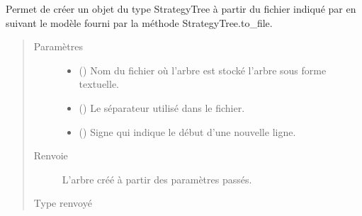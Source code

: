 \documentclass[letterpaper,10pt,french]{sphinxmanual}
\begin{document}
\begin{fulllineitems}
\begin{fulllineitems}
\begin{quote}
\begin{description}
\end{description}\end{quote}

\end{fulllineitems}


\end{fulllineitems}


\begin{fulllineitems}
\label{\detokenize{index:StrategyTree.st_from_file}}
Permet de créer un objet du type StrategyTree à partir du fichier indiqué
par  en suivant le modèle fourni par la méthode
StrategyTree.to\_file.
\begin{quote}\begin{description}
\item[{Paramètres}] \leavevmode\begin{itemize}
\item {} 
 (\sphinxstyleliteralemphasis{\sphinxupquote{, }}) \textendash{} Nom du fichier où l’arbre est stocké l’arbre sous forme textuelle.

\item {} 
 (\sphinxstyleliteralemphasis{\sphinxupquote{, }}) \textendash{} Le séparateur utilisé dans le fichier.

\item {} 
 (\sphinxstyleliteralemphasis{\sphinxupquote{, }}) \textendash{} Signe qui indique le début d’une nouvelle ligne.

\end{itemize}

\item[{Renvoie}] \leavevmode
{} \textendash{} L’arbre créé à partir des paramètres passés.

\item[{Type renvoyé}] \leavevmode
{\hyperref[\detokenize{index:StrategyTree.StrategyTree}]{}}

\end{description}\end{quote}

\end{fulllineitems}
\end{document}
